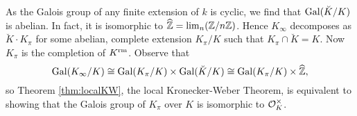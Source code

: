 \documentclass[../main.tex]{subfiles}
\begin{document}
As the Galois group of any finite extension
of $k$ is cyclic, we find that $\operatorname{Gal}(\breve K/K)$ is abelian. In fact,
it is isomorphic to $\widehat {\mathbb{Z}} = \lim_n (\mathbb{Z}/n\mathbb{Z})$. Hence
$K_\infty$ decomposes as $\breve K \cdot K_\pi$ for some abelian, complete
extension $K_\pi/K$ such that $K_\pi \cap \breve K = K$. Now $K_\pi$ is the 
completion of $K^{\mathrm{rm}}$. Observe that
\begin{equation*}
  \operatorname{Gal}(K_\infty/K) \cong \operatorname{Gal}(K_\pi/K) \times \operatorname{Gal}(\breve K/K) \cong
  \operatorname{Gal}(K_\pi/K) \times \widehat {\mathbb{Z}},
\end{equation*}
so Theorem \ref{thm:localKW}, the local Kronecker-Weber Theorem, is 
equivalent to showing that the Galois group of $K_\pi$ over $K$ is 
isomorphic to $\mathcal{O}_K^\times$.


\end{document}
